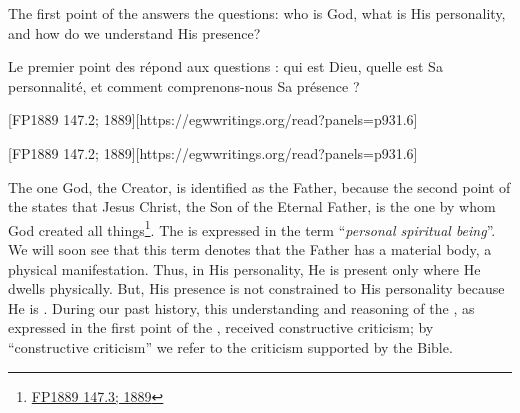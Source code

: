 



The first point of the  answers the questions: who is God, what is His personality, and how do we understand His presence?


Le premier point des  répond aux questions : qui est Dieu, quelle est Sa personnalité, et comment comprenons-nous Sa présence ?


[FP1889 147.2; 1889][https://egwwritings.org/read?panels=p931.6]


[FP1889 147.2; 1889][https://egwwritings.org/read?panels=p931.6]


The one God, the Creator, is identified as the Father, because the second point of the  states that Jesus Christ, the Son of the Eternal Father, is the one by whom God created all things\footnote{\href{https://egwwritings.org/?ref=en_FP1889.147.3&para=931.7}{FP1889 147.3; 1889}}. The  is expressed in the term “\textit{personal spiritual being}”. We will soon see that this term denotes that the Father has a material body, a physical manifestation. Thus, in His personality, He is present only where He dwells physically. But, His presence is not constrained to His personality because He is . During our past history, this understanding and reasoning of the , as expressed in the first point of the , received constructive criticism; by “constructive criticism” we refer to the criticism supported by the Bible.


